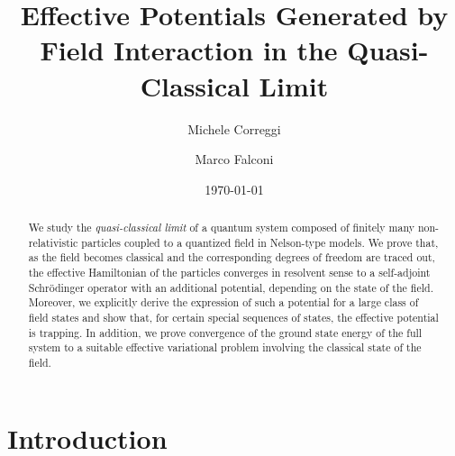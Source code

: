 \documentclass[11pt,a4paper,reqno]{amsart}
\theoremstyle{definition}
\numberwithin{equation}{section}
\begin{document}


\title[Effective Potentials in the Quasi-Classical Limit]{Effective Potentials Generated by Field Interaction in the Quasi-Classical Limit}

\author{Michele Correggi}\address{Dipartimento di Matematica ``G. Castelnuovo'', Universit\`{a} degli Studi di Roma ``La Sapienza''; P.le Aldo Moro 5, 00185, Roma, Italy.}
\author{Marco Falconi}\address{Dipartimento di Matematica e Fisica, Università degli Studi Roma Tre; Largo San Leonardo
  Murialdo 1, Palazzo C, 00146, Roma, Italy.}

\begin{abstract}
We study the {\it quasi-classical limit} of a quantum system composed of finitely many non-relativistic particles coupled to a quantized field in Nelson-type models. We prove that, as the field becomes classical and the corresponding degrees of freedom are traced out, the effective Hamiltonian of the particles converges in resolvent sense to a self-adjoint Schr\"{o}dinger operator with an additional potential, depending on the state of the field. Moreover, we explicitly derive the expression of such a potential for a large class of field states and show that, for certain special sequences of states, the effective potential is trapping. In addition, we prove convergence of the ground state energy of the full system to a suitable effective variational problem involving the classical state of the field.
\end{abstract}

\keywords{}\subjclass[2010]{}

\date{\today}
\maketitle

\tableofcontents

\section{Introduction}
\label{sec:introduction}
\end{document}
